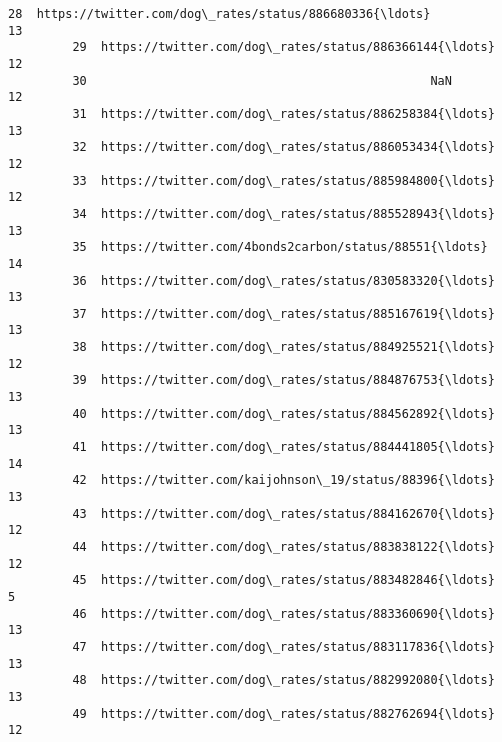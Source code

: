 \documentclass[11pt]{article}
\begin{document}
\begin{Verbatim}[commandchars=\\\{\}]
         28  https://twitter.com/dog\_rates/status/886680336{\ldots}                13   
         29  https://twitter.com/dog\_rates/status/886366144{\ldots}                12   
         30                                                NaN                12   
         31  https://twitter.com/dog\_rates/status/886258384{\ldots}                13   
         32  https://twitter.com/dog\_rates/status/886053434{\ldots}                12   
         33  https://twitter.com/dog\_rates/status/885984800{\ldots}                12   
         34  https://twitter.com/dog\_rates/status/885528943{\ldots}                13   
         35  https://twitter.com/4bonds2carbon/status/88551{\ldots}                14   
         36  https://twitter.com/dog\_rates/status/830583320{\ldots}                13   
         37  https://twitter.com/dog\_rates/status/885167619{\ldots}                13   
         38  https://twitter.com/dog\_rates/status/884925521{\ldots}                12   
         39  https://twitter.com/dog\_rates/status/884876753{\ldots}                13   
         40  https://twitter.com/dog\_rates/status/884562892{\ldots}                13   
         41  https://twitter.com/dog\_rates/status/884441805{\ldots}                14   
         42  https://twitter.com/kaijohnson\_19/status/88396{\ldots}                13   
         43  https://twitter.com/dog\_rates/status/884162670{\ldots}                12   
         44  https://twitter.com/dog\_rates/status/883838122{\ldots}                12   
         45  https://twitter.com/dog\_rates/status/883482846{\ldots}                 5   
         46  https://twitter.com/dog\_rates/status/883360690{\ldots}                13   
         47  https://twitter.com/dog\_rates/status/883117836{\ldots}                13   
         48  https://twitter.com/dog\_rates/status/882992080{\ldots}                13   
         49  https://twitter.com/dog\_rates/status/882762694{\ldots}                12   
         

\end{Verbatim}
\end{document}
